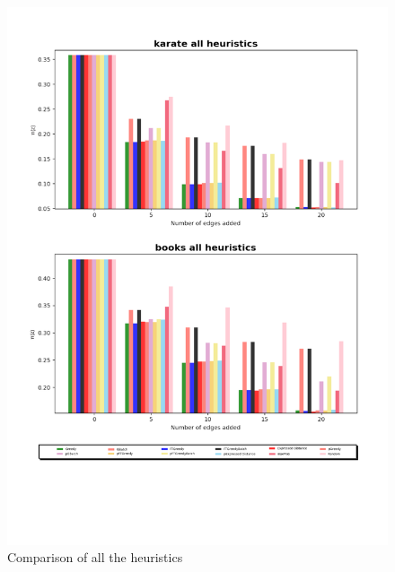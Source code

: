 \begin{figure}[!htbp]
	\begin{center}
	\advance\leftskip-1.3cm
	\captionsetup{justification=centering,margin=2cm}
	\includegraphics[width=1\textwidth]{Figures/all1}
	\caption{Comparison of all the heuristics}
	\end{center}
	\label{all2}
\end{figure}

